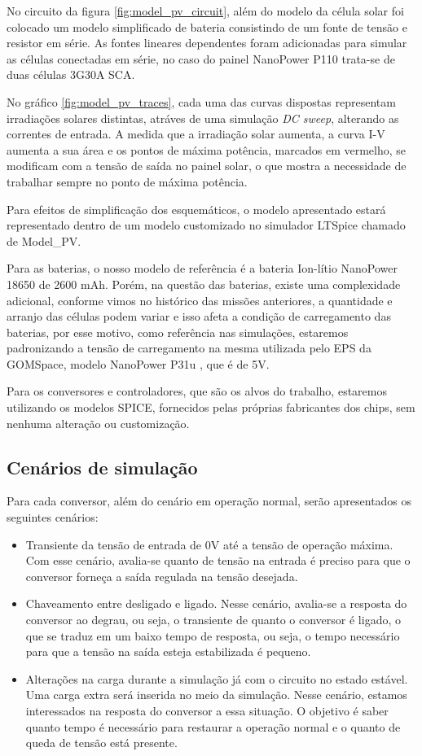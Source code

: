 No circuito da figura \ref{fig:model_pv_circuit}, além do modelo da célula solar foi colocado um modelo simplificado de bateria consistindo de um fonte de tensão e resistor em série. As fontes lineares dependentes foram adicionadas para simular as células conectadas em série, no caso do painel NanoPower P110 trata-se de duas células 3G30A SCA.

No gráfico \ref{fig:model_pv_traces}, cada uma das curvas dispostas representam irradiações solares distintas, atráves de uma simulação \textit{DC sweep}, alterando as correntes de entrada. A medida que a irradiação solar aumenta, a curva I-V aumenta a sua área e os pontos de máxima potência, marcados em vermelho, se modificam com a tensão de saída no painel solar, o que mostra a necessidade de trabalhar sempre no ponto de máxima potência.  

Para efeitos de simplificação dos esquemáticos, o modelo apresentado estará representado dentro de um modelo customizado no simulador LTSpice chamado de Model\_PV.

Para as baterias, o nosso modelo de referência \cite{battery_gomspace_datasheet} é a bateria Ion-lítio NanoPower 18650 de 2600 mAh. Porém, na questão das baterias, existe uma complexidade adicional, conforme vimos no histórico das missões anteriores, a quantidade e arranjo das células podem variar e isso afeta a condição de carregamento das baterias, por esse motivo, como referência nas simulações, estaremos padronizando a tensão de carregamento na mesma utilizada pelo EPS da GOMSpace, modelo NanoPower P31u \cite{eps_gomspace_datasheet}, que é de 5V.

Para os conversores e controladores, que são os alvos do trabalho, estaremos utilizando os modelos SPICE, fornecidos pelas próprias fabricantes dos chips, sem nenhuma alteração ou customização. 

\subsection*{Cenários de simulação}

Para cada conversor, além do cenário em operação normal, serão apresentados os seguintes cenários:
\begin{itemize}
    \item Transiente da tensão de entrada de 0V até a tensão de operação máxima. Com esse cenário, avalia-se quanto de tensão na entrada é preciso para que o conversor forneça a saída regulada na tensão desejada.
    \item Chaveamento entre desligado e ligado. Nesse cenário, avalia-se a resposta do conversor ao degrau, ou seja, o transiente de quanto o conversor é ligado, o que se traduz em um baixo tempo de resposta, ou seja, o tempo necessário para que a tensão na saída esteja estabilizada é pequeno.
    \item Alterações na carga durante a simulação já com o circuito no estado estável. Uma carga extra será inserida no meio da simulação. Nesse cenário, estamos interessados na resposta do conversor a essa situação. O objetivo é saber quanto tempo é necessário para restaurar a operação normal e o quanto de queda de tensão está presente. 
\end{itemize}


